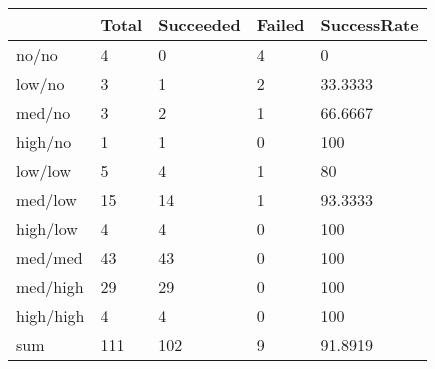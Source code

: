 \begin{tabular}{lllll}
& Total & Succeeded & Failed & SuccessRate \\ 
\hline 
no/no & 4 & 0 & 4 & 0 \\ 
low/no & 3 & 1 & 2 & 33.3333 \\ 
med/no & 3 & 2 & 1 & 66.6667 \\ 
high/no & 1 & 1 & 0 & 100 \\ 
low/low & 5 & 4 & 1 & 80 \\ 
med/low & 15 & 14 & 1 & 93.3333 \\ 
high/low & 4 & 4 & 0 & 100 \\ 
med/med & 43 & 43 & 0 & 100 \\ 
med/high & 29 & 29 & 0 & 100 \\ 
high/high & 4 & 4 & 0 & 100 \\ 
sum & 111 & 102 & 9 & 91.8919 \\ 
\hline 
\end{tabular}
